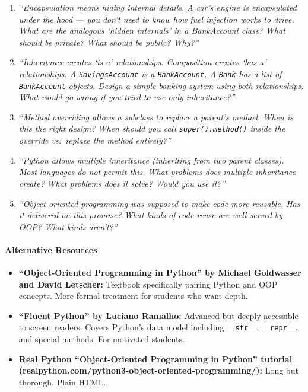 \documentclass[
  justified,
  openright,
]{tufte-book}
\let\paragraph\paragraph
\let\paragraph\paragraph
\providecommand{\tightlist}{%
  \setlength{\itemsep}{0pt}\setlength{\parskip}{0pt}}
\begin{document}
\begin{enumerate}
\def\labelenumi{\arabic{enumi}.}
\item
  \emph{``Encapsulation means hiding internal details. A car's engine is
  encapsulated under the hood --- you don't need to know how fuel
  injection works to drive. What are the analogous `hidden internals' in
  a BankAccount class? What should be private? What should be public?
  Why?''}
\item
  \emph{``Inheritance creates `is-a' relationships. Composition creates
  `has-a' relationships. A \texttt{SavingsAccount} is-a
  \texttt{BankAccount}. A \texttt{Bank} has-a list of
  \texttt{BankAccount} objects. Design a simple banking system using
  both relationships. What would go wrong if you tried to use only
  inheritance?''}
\item
  \emph{``Method overriding allows a subclass to replace a parent's
  method. When is this the right design? When should you call
  \texttt{super().method()} inside the override vs.~replace the method
  entirely?''}
\item
  \emph{``Python allows multiple inheritance (inheriting from two parent
  classes). Most languages do not permit this. What problems does
  multiple inheritance create? What problems does it solve? Would you
  use it?''}
\item
  \emph{``Object-oriented programming was supposed to make code more
  reusable. Has it delivered on this promise? What kinds of code reuse
  are well-served by OOP? What kinds aren't?''}
\end{enumerate}

\paragraph{Alternative Resources}\label{alternative-resources-5}

\begin{itemize}
\tightlist
\item
  \textbf{``Object-Oriented Programming in Python'' by Michael
  Goldwasser and David Letscher:} Textbook specifically pairing Python
  and OOP concepts. More formal treatment for students who want depth.
\item
  \textbf{``Fluent Python'' by Luciano Ramalho:} Advanced but deeply
  accessible to screen readers. Covers Python's data model including
  \texttt{\_\_str\_\_}, \texttt{\_\_repr\_\_}, and special methods. For
  motivated students.
\item
  \textbf{Real Python ``Object-Oriented Programming in Python'' tutorial
  (realpython.com/python3-object-oriented-programming/):} Long but
  thorough. Plain HTML.
\end{itemize}
\end{document}

